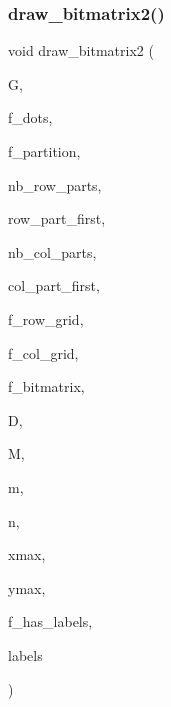 \mbox{\label{draw_8_c_ab99dc708703e1ff4a9b756779a2524f2}} 
\subsubsection{\texorpdfstring{draw\+\_\+bitmatrix2()}{draw\_bitmatrix2()}}
{\footnotesize\ttfamily void draw\+\_\+bitmatrix2 (\begin{DoxyParamCaption}\item[{\mbox{\hyperlink{classmp__graphics}{mp\+\_\+graphics}} \&}]{G,  }\item[{\mbox{\hyperlink{galois_8h_a09fddde158a3a20bd2dcadb609de11dc}{I\+NT}}}]{f\+\_\+dots,  }\item[{\mbox{\hyperlink{galois_8h_a09fddde158a3a20bd2dcadb609de11dc}{I\+NT}}}]{f\+\_\+partition,  }\item[{\mbox{\hyperlink{galois_8h_a09fddde158a3a20bd2dcadb609de11dc}{I\+NT}}}]{nb\+\_\+row\+\_\+parts,  }\item[{\mbox{\hyperlink{galois_8h_a09fddde158a3a20bd2dcadb609de11dc}{I\+NT}} $\ast$}]{row\+\_\+part\+\_\+first,  }\item[{\mbox{\hyperlink{galois_8h_a09fddde158a3a20bd2dcadb609de11dc}{I\+NT}}}]{nb\+\_\+col\+\_\+parts,  }\item[{\mbox{\hyperlink{galois_8h_a09fddde158a3a20bd2dcadb609de11dc}{I\+NT}} $\ast$}]{col\+\_\+part\+\_\+first,  }\item[{\mbox{\hyperlink{galois_8h_a09fddde158a3a20bd2dcadb609de11dc}{I\+NT}}}]{f\+\_\+row\+\_\+grid,  }\item[{\mbox{\hyperlink{galois_8h_a09fddde158a3a20bd2dcadb609de11dc}{I\+NT}}}]{f\+\_\+col\+\_\+grid,  }\item[{\mbox{\hyperlink{galois_8h_a09fddde158a3a20bd2dcadb609de11dc}{I\+NT}}}]{f\+\_\+bitmatrix,  }\item[{\mbox{\hyperlink{galois_8h_a122c4acf389c050379f00341fdcd5812}{U\+B\+Y\+TE}} $\ast$}]{D,  }\item[{\mbox{\hyperlink{galois_8h_a09fddde158a3a20bd2dcadb609de11dc}{I\+NT}} $\ast$}]{M,  }\item[{\mbox{\hyperlink{galois_8h_a09fddde158a3a20bd2dcadb609de11dc}{I\+NT}}}]{m,  }\item[{\mbox{\hyperlink{galois_8h_a09fddde158a3a20bd2dcadb609de11dc}{I\+NT}}}]{n,  }\item[{\mbox{\hyperlink{galois_8h_a09fddde158a3a20bd2dcadb609de11dc}{I\+NT}}}]{xmax,  }\item[{\mbox{\hyperlink{galois_8h_a09fddde158a3a20bd2dcadb609de11dc}{I\+NT}}}]{ymax,  }\item[{\mbox{\hyperlink{galois_8h_a09fddde158a3a20bd2dcadb609de11dc}{I\+NT}}}]{f\+\_\+has\+\_\+labels,  }\item[{\mbox{\hyperlink{galois_8h_a09fddde158a3a20bd2dcadb609de11dc}{I\+NT}} $\ast$}]{labels }\end{DoxyParamCaption})}


